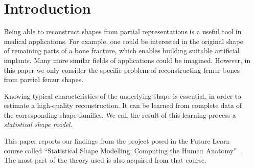 \section{Introduction}
\label{sec:intro}


Being able to reconstruct shapes from partial representations is a useful tool in medical applications.
For example, one could be interested in the original shape of remaining parts of a bone fracture, which enables building suitable artificial implants.
Many more similar fields of applications could be imagined.
However, in this paper we only consider the specific problem of reconstructing femur bones from partial femur shapes.

Knowing typical characteristics of the underlying shape is essential, in order to estimate a high-quality reconstruction.
It can be learned from complete data of the corresponding shape families.
We call the result of this learning process a \emph{statistical shape model}.

This paper reports our findings from the project posed in the Future Learn course called ``Statistical Shape Modelling: Computing the Human Anatomy''~\cite{mooc2019statistical}.
The most part of the theory used is also acquired from that course.
